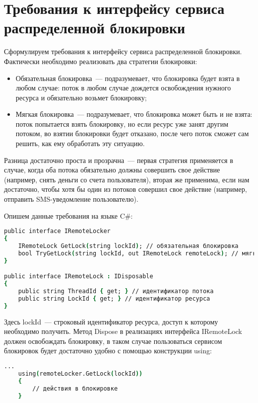 \section{Требования к интерфейсу сервиса распределенной блокировки}

Сформулируем требования к интерфейсу сервиса распределенной блокировки. Фактически необходимо реализовать два стратегии блокировки:

\begin{itemize} 
	\item Обязательная блокировка~--- подразумевает, что блокировка будет взята в любом случае: поток в любом случае дождется освобождения нужного ресурса и обязательно возьмет блокировку;
	\item Мягкая блокировка~--- подразумевает, что блокировка может быть и не взята: поток попытается взять блокировку, но если ресурс уже занят другим потоком, во взятии блокировки будет отказано, после чего поток сможет сам решить, как ему обработать эту ситуацию.
\end{itemize}

Разница достаточно проста и прозрачна~--- первая стратегия применяется в случае, когда оба потока обязательно должны совершить свое действие (например, снять деньги со счета пользователя), вторая же применима, если нам достаточно, чтобы хотя бы один из потоков совершил свое действие (например, отправить SMS-уведомление пользователю). 

Опишем данные требования на языке C\#:

\begin{lstlisting}[language=csh,caption={Описание интерфейса}]
public interface IRemoteLocker
{
	IRemoteLock GetLock(string lockId); // обязательная блокировка
	bool TryGetLock(string lockId, out IRemoteLock remoteLock); // мягкая блокировка
}

public interface IRemoteLock : IDisposable
{
	public string ThreadId { get; } // идентификатор потока
	public string LockId { get; } // идентификатор ресурса
}
\end{lstlisting}

Здесь lockId~--- строковый идентификатор ресурса, доступ к которому необходимо получить. Метод Dispose в реализациях интерфейса IRemoteLock должен освобождать блокировку, в таком случае пользоваться сервисом блокировок будет достаточно удобно с помощью конструкции using:

\begin{lstlisting}[language=csh,caption={Использование конструкции using}]
	...
	using(remoteLocker.GetLock(lockId))
	{
		// действия в блокировке
	}
\end{lstlisting}